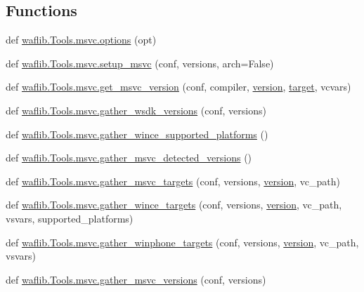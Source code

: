 \subsection*{Functions}
\begin{DoxyCompactItemize}
\item 
def \hyperlink{namespacewaflib_1_1_tools_1_1msvc_a2c0fdbc609fbe0cb5a325b101835a489}{waflib.\+Tools.\+msvc.\+options} (opt)
\item 
def \hyperlink{namespacewaflib_1_1_tools_1_1msvc_afba1206992858f99b00e632f2e0c2c1d}{waflib.\+Tools.\+msvc.\+setup\+\_\+msvc} (conf, versions, arch=False)
\item 
def \hyperlink{namespacewaflib_1_1_tools_1_1msvc_a6f31284847049b4f0be838fc7fd06786}{waflib.\+Tools.\+msvc.\+get\+\_\+msvc\+\_\+version} (conf, compiler, \hyperlink{lib_2expat_8h_aec5db107b91447a96c47961ce9df2660}{version}, \hyperlink{lib_2expat_8h_a15a257516a87decb971420e718853137}{target}, vcvars)
\item 
def \hyperlink{namespacewaflib_1_1_tools_1_1msvc_a3d32a702d53caab847ca6e867019a30c}{waflib.\+Tools.\+msvc.\+gather\+\_\+wsdk\+\_\+versions} (conf, versions)
\item 
def \hyperlink{namespacewaflib_1_1_tools_1_1msvc_a28005f4305bcbdb7a1a59d22b185c2ce}{waflib.\+Tools.\+msvc.\+gather\+\_\+wince\+\_\+supported\+\_\+platforms} ()
\item 
def \hyperlink{namespacewaflib_1_1_tools_1_1msvc_aff791d3a81321fa3dab5f4a07b931619}{waflib.\+Tools.\+msvc.\+gather\+\_\+msvc\+\_\+detected\+\_\+versions} ()
\item 
def \hyperlink{namespacewaflib_1_1_tools_1_1msvc_af9be199299cf9f16cca30ae8b169d4d5}{waflib.\+Tools.\+msvc.\+gather\+\_\+msvc\+\_\+targets} (conf, versions, \hyperlink{lib_2expat_8h_aec5db107b91447a96c47961ce9df2660}{version}, vc\+\_\+path)
\item 
def \hyperlink{namespacewaflib_1_1_tools_1_1msvc_a8fa5731e2eceb49992ad6e3a0f0d0e51}{waflib.\+Tools.\+msvc.\+gather\+\_\+wince\+\_\+targets} (conf, versions, \hyperlink{lib_2expat_8h_aec5db107b91447a96c47961ce9df2660}{version}, vc\+\_\+path, vsvars, supported\+\_\+platforms)
\item 
def \hyperlink{namespacewaflib_1_1_tools_1_1msvc_a6a24a12a1b399800a1f44756e45f5f9e}{waflib.\+Tools.\+msvc.\+gather\+\_\+winphone\+\_\+targets} (conf, versions, \hyperlink{lib_2expat_8h_aec5db107b91447a96c47961ce9df2660}{version}, vc\+\_\+path, vsvars)
\item 
def \hyperlink{namespacewaflib_1_1_tools_1_1msvc_afb920b4d44d2cf1a0c571bdbead2d7ad}{waflib.\+Tools.\+msvc.\+gather\+\_\+msvc\+\_\+versions} (conf, versions)

\end{DoxyCompactItemize}
